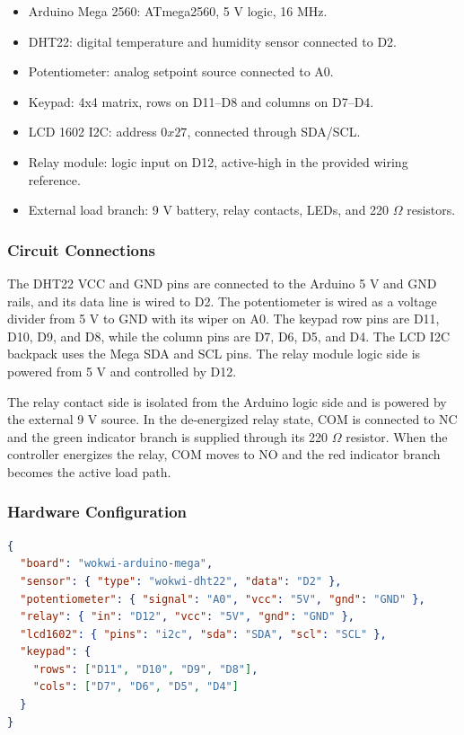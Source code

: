 \begin{itemize}
    \item Arduino Mega 2560: ATmega2560, 5 V logic, 16 MHz.
    \item DHT22: digital temperature and humidity sensor connected to D2.
    \item Potentiometer: analog setpoint source connected to A0.
    \item Keypad: 4x4 matrix, rows on D11--D8 and columns on D7--D4.
    \item LCD 1602 I2C: address \(0x27\), connected through SDA/SCL.
    \item Relay module: logic input on D12, active-high in the provided wiring reference.
    \item External load branch: 9 V battery, relay contacts, LEDs, and 220 \(\Omega\) resistors.
\end{itemize}

\subsubsection{Circuit Connections}

The DHT22 VCC and GND pins are connected to the Arduino 5 V and GND rails, and its data line is wired to D2. The potentiometer is wired as a voltage divider from 5 V to GND with its wiper on A0. The keypad row pins are D11, D10, D9, and D8, while the column pins are D7, D6, D5, and D4. The LCD I2C backpack uses the Mega SDA and SCL pins. The relay module logic side is powered from 5 V and controlled by D12.

The relay contact side is isolated from the Arduino logic side and is powered by the external 9 V source. In the de-energized relay state, COM is connected to NC and the green indicator branch is supplied through its 220 \(\Omega\) resistor. When the controller energizes the relay, COM moves to NO and the red indicator branch becomes the active load path.

\subsubsection{Hardware Configuration}

\begin{lstlisting}[language=json, caption=Essential Wokwi wiring reference for Lab 5.1, label=lst:wokwi_reference]
{
  "board": "wokwi-arduino-mega",
  "sensor": { "type": "wokwi-dht22", "data": "D2" },
  "potentiometer": { "signal": "A0", "vcc": "5V", "gnd": "GND" },
  "relay": { "in": "D12", "vcc": "5V", "gnd": "GND" },
  "lcd1602": { "pins": "i2c", "sda": "SDA", "scl": "SCL" },
  "keypad": {
    "rows": ["D11", "D10", "D9", "D8"],
    "cols": ["D7", "D6", "D5", "D4"]
  }
}
\end{lstlisting}

